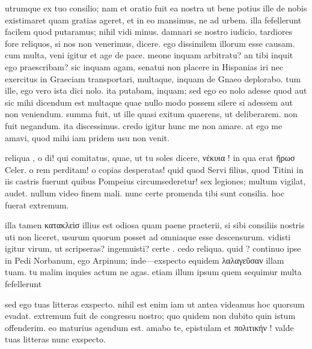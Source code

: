 


 utrumque ex tuo consilio; nam et oratio fuit ea nostra ut bene potius ille de nobis existimaret quam gratias ageret, et in eo mansimus, ne ad urbem. illa fefellerunt facilem quod putaramus; nihil vidi minus. damnari se nostro iudicio, tardiores fore reliquos, si nos non venerimus, dicere. ego dissimilem illorum esse causam. cum multa, veni igitur et age de pace. meone inquam arbitratu? an tibi inquit ego praescribam? sic inquam agam, senatui non placere in Hispanias iri nec exercitus in Graeciam transportari, multaque, inquam de Gnaeo deplorabo. tum ille, ego vero ista dici nolo. ita putabam, inquam; sed ego eo nolo adesse quod aut sic mihi dicendum est multaque quae nullo modo possem silere si adessem aut non veniendum. summa fuit, ut ille quasi exitum quaerens, ut deliberarem. non fuit negandum. ita discessimus. credo igitur hunc me non amare. at ego me amavi, quod mihi iam pridem usu non venit.

 reliqua , o di! qui comitatus, quae, ut tu soles dicere, νέκυια ! in qua erat ἥρωσ Celer. o rem perditam! o copias desperatas! quid quod Servi filius, quod Titini in iis castris fuerunt quibus Pompeius circumsederetur! sex legiones; multum vigilat, audet. nullum video finem mali. nunc certe promenda tibi sunt consilia. hoc fuerat extremum.

 illa tamen κατακλεὶσ illius est odiosa quam paene praeterii, si sibi consiliis nostris uti non liceret, usurum quorum posset ad omniaque esse descensurum. vidisti igitur virum, ut scripseras? ingemuisti? certe . cedo reliqua. quid ? continuo ipse in Pedi Norbanum, ego Arpinum; inde—exspecto equidem λαλαγεῦσαν illam tuam. tu malim inquies actum ne agas. etiam illum ipsum quem sequimur multa fefellerunt

 sed ego tuas litteras exspecto. nihil est enim iam ut antea videamus hoc quorsum evadat. extremum fuit de congressu nostro; quo quidem non dubito quin istum offenderim. eo maturius agendum est. amabo te, epistulam et πολιτικήν ! valde tuas litteras nunc exspecto.
